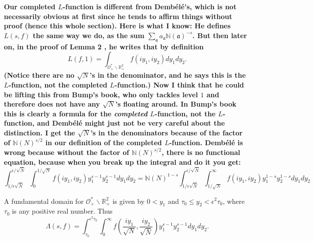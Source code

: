 \documentclass{article}
\theoremstyle{plain}
\begin{document}
\textbf{Our completed $L$-function is different from Demb\'{e}l\'{e}'s, which is not necessarily obvious at first since he tends to affirm things without proof (hence this whole section). Here is what I know: He defines $L(s,f)$ the same way we do, as the sum $\sum_{\mathfrak{a}}a_{\mathfrak{a}}\mathbb{N}(\mathfrak{a})^{-s}$. But then later on, in the proof of Lemma 2 \cite{dembele}, he writes that by definition
\begin{equation*}
L(f,1)= \int_{\mathcal{O}_+^*\backslash \mathbb{R}^2_+} f\left(iy_1,iy_2\right) dy_1 dy_2.
\end{equation*}
(Notice there are no $\sqrt{N}$'s in the denominator, and he says this is the $L$-function, not the completed $L$-function.) Now I think that he could be lifting this from Bump's book, who only tackles level $1$ and therefore does not have any $\sqrt{N}$'s floating around. In Bump's book this is clearly a formula for the \emph{completed} $L$-function, not the $L$-function, and Demb\'{e}l\'{e} might just not be very careful about the distinction. I get the $\sqrt{N}$'s in the denominators because of the factor of $\mathbb{N}(N)^{s/2}$ in our definition of the completed $L$-function. Demb\'{e}l\'{e} is wrong because without the factor of $\mathbb{N}(N)^{s/2}$, there is no functional equation, because when you break up the integral and do it you get:
\begin{equation*}
\int_{1/\epsilon\sqrt{\bar{N}}}^{\epsilon/\sqrt{\bar{N}}} \int_0^{1/\sqrt{N}} f(iy_1,iy_2)y_1^{s-1}y_2^{s-1}dy_1 dy_2 = \mathbb{N}(N)^{1-s}\int_{1/\epsilon\sqrt{\bar{N}}}^{\epsilon/\sqrt{\bar{N}}} \int_{1/\sqrt{N}}^{\infty} f(iy_1,iy_2)y_1^{1-s}y_2^{1-s}dy_1 dy_2
\end{equation*}}

A fundamental domain for $\mathcal{O}_+^*\backslash \mathbb{R}^2_+$ is given by $0<y_1$ and $\tau_0 \leq y_2 < \epsilon^2 \tau_0$, where $\tau_0$ is any positive real number. Thus
\begin{equation*}
\Lambda(s,f)= \int_{\tau_0}^{\epsilon^2 \tau_0}\int_{0}^{\infty} f\left(\frac{iy_1}{\sqrt{N}},\frac{iy_2}{\sqrt{\bar{N}}}\right) y_1^{s-1}y_2^{s-1} dy_1 dy_2.
\end{equation*}
\end{document}
